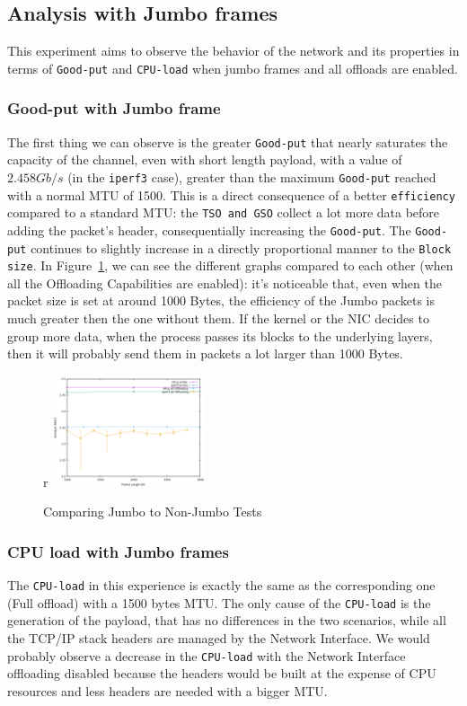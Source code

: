 \documentclass{exam}
\begin{document}
\subsection{Analysis with Jumbo frames}
This experiment aims to observe the behavior of the network and its properties in terms of \verb|Good-put| and \verb|CPU-load| when jumbo frames and all offloads are enabled.

\subsubsection{Good-put with Jumbo frame}
The first thing we can observe is the greater \verb|Good-put| that nearly saturates the capacity of the channel, even with short length payload, with a value of  $2.458 Gb/s$ (in the \texttt{iperf3} case), greater than the maximum \verb|Good-put| reached with a normal MTU of 1500. This is a direct consequence of a better \verb|efficiency| compared to a standard MTU: the \verb|TSO and GSO| collect a lot more data before adding the packet's header, consequentially increasing the \verb|Good-put|. The \verb|Good-put| continues to slightly increase in a directly proportional manner to the \verb|Block size|. In  Figure~\ref{fig:jumbo-comparison}, we can see the different graphs compared to each other (when all the Offloading Capabilities are enabled): it's noticeable that, even when the packet size is set at around 1000 Bytes, the efficiency of the Jumbo packets is much greater then the one without them. If the kernel or the NIC decides to group more data, when the process passes its blocks to the underlying layers, then it will probably send them in packets a lot larger than 1000 Bytes.

\begin{figure}{r}
    \centering
    \includegraphics[width=0.40\textwidth]{jumbo-comparison.png}
    \caption{Comparing Jumbo to Non-Jumbo Tests}
    \label{fig:jumbo-comparison}
\end{figure}

\subsubsection{CPU load with Jumbo frames}
The \verb|CPU-load| in this experience is exactly the same as the corresponding one (Full offload) with a 1500 bytes MTU. The only cause of the \verb|CPU-load| is the generation of the payload, that has no differences in the two scenarios, while all the TCP/IP stack headers are managed by the Network Interface. We would probably observe a decrease in the \verb|CPU-load| with the Network Interface offloading disabled because the headers would be built at the expense of CPU resources and less headers are needed with a bigger MTU. 
\end{document}

